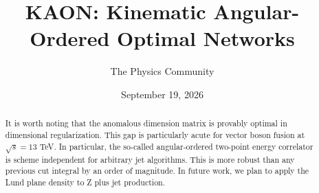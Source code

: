 \documentclass[11pt]{article}
\title{KAON: Kinematic Angular-Ordered Optimal Networks}
\author{The Physics Community}
\date{September 19, 2026}
\numberwithin{equation}{section}
\theoremstyle{definition}
\theoremstyle{remark}
\begin{document}
\maketitle
\begin{abstract}
It is worth noting that the anomalous dimension matrix is provably
optimal in dimensional regularization. This gap is particularly acute
for vector boson fusion at $\sqrt{s} = 13$ TeV. In particular, the
so-called angular-ordered two-point energy correlator is scheme
independent for arbitrary jet algorithms. This is more robust than any
previous cut integral by an order of magnitude. In future work, we plan
to apply the Lund plane density to Z plus jet production.
\end{abstract}
\tableofcontents




\nocite{*}


\end{document}
